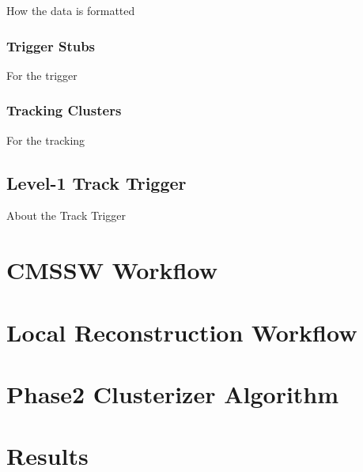             How the data is formatted

            \subsubsection{Trigger Stubs}

                For the trigger

            \subsubsection{Tracking Clusters}

                For the tracking

        \subsection{Level-1 Track Trigger}

            About the Track Trigger

    \section{CMSSW Workflow}

    \section{Local Reconstruction Workflow}

    \section{Phase2 Clusterizer Algorithm}

    \section{Results}
